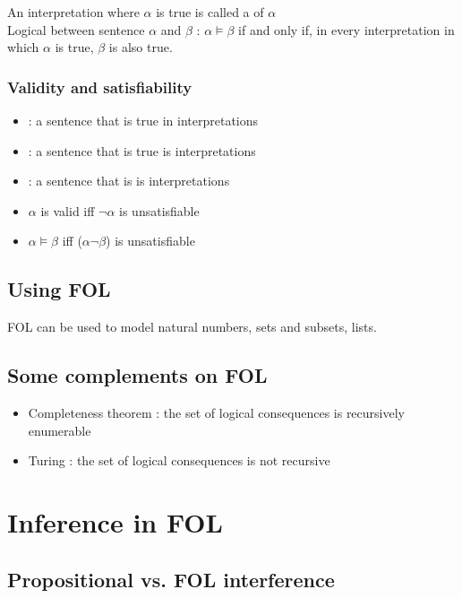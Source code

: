 An interpretation where $\alpha$ is true is called a  of $\alpha$\\
Logical  between sentence $\alpha$ and $\beta$ : $\alpha \models \beta$ if and only if, in every interpretation in which $\alpha$ is true, $\beta$ is also true.

\subsubsection{Validity and satisfiability}

\begin{itemize}
\item {} : a sentence that is true in  interpretations
\item {} : a sentence that is true is  interpretations
\item {} : a sentence that is  is  interpretations
\item $\alpha$ is valid iff $\neg \alpha$ is unsatisfiable
\item $\alpha \models \beta$ iff ($\alpha \neg \beta$) is unsatisfiable
\end{itemize}

\subsection{Using FOL}

FOL can be used to model natural numbers, sets and subsets, lists.

\subsection{Some complements on FOL}

\begin{itemize}
\item Completeness theorem : the set of logical consequences is recursively enumerable
\item Turing : the set of logical consequences is not recursive
\end{itemize}

\newpage
\section{Inference in FOL}

\subsection{Propositional vs. FOL interference}

